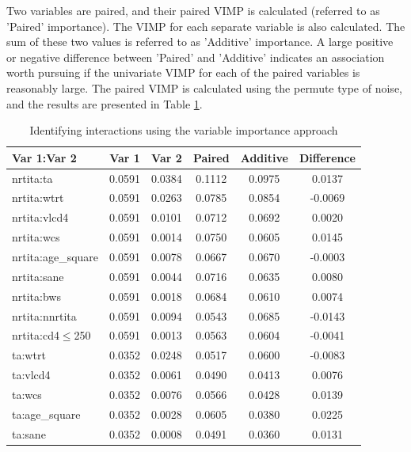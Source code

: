 \documentclass[10pt]{NSP1}
\begin{document}
Two variables are paired, and their paired VIMP is calculated (referred to as ’Paired’ importance). The VIMP for each separate variable is also calculated. The sum of these two values is referred to as ’Additive’ importance. A large positive or negative difference between ’Paired’ and ’Additive’ indicates an association worth pursuing if the univariate VIMP for each of the paired variables is reasonably large. The paired VIMP is calculated using the permute type of noise, and the results are presented in Table \ref{tab:interactions}.

\begin{table}[t]
    \centering
    \caption{Identifying interactions using the variable importance approach}
    \label{tab:interactions}
    \begin{tabular}{@{}lccccc@{}}
        \toprule
        \textbf{Var 1:Var 2} & \textbf{Var 1} & \textbf{Var 2} & \textbf{Paired} & \textbf{Additive} & \textbf{Difference} \\
        \midrule
        nrtita:ta           & 0.0591 & 0.0384 & 0.1112 & 0.0975 & 0.0137 \\
        nrtita:wtrt         & 0.0591 & 0.0263 & 0.0785 & 0.0854 & -0.0069 \\
        nrtita:vlcd4        & 0.0591 & 0.0101 & 0.0712 & 0.0692 & 0.0020 \\
        nrtita:wcs          & 0.0591 & 0.0014 & 0.0750 & 0.0605 & 0.0145 \\
        nrtita:age\_square  & 0.0591 & 0.0078 & 0.0667 & 0.0670 & -0.0003 \\
        nrtita:sane         & 0.0591 & 0.0044 & 0.0716 & 0.0635 & 0.0080 \\
        nrtita:bws          & 0.0591 & 0.0018 & 0.0684 & 0.0610 & 0.0074 \\
        nrtita:nnrtita      & 0.0591 & 0.0094 & 0.0543 & 0.0685 & -0.0143 \\
        nrtita:cd4$\leq$250    & 0.0591 & 0.0013 & 0.0563 & 0.0604 & -0.0041 \\
        ta:wtrt             & 0.0352 & 0.0248 & 0.0517 & 0.0600 & -0.0083 \\
        ta:vlcd4            & 0.0352 & 0.0061 & 0.0490 & 0.0413 & 0.0076 \\
        ta:wcs              & 0.0352 & 0.0076 & 0.0566 & 0.0428 & 0.0139 \\
        ta:age\_square      & 0.0352 & 0.0028 & 0.0605 & 0.0380 & 0.0225 \\
        ta:sane             & 0.0352 & 0.0008 & 0.0491 & 0.0360 & 0.0131 \\

\end{tabular}
\end{table}
\end{document}
